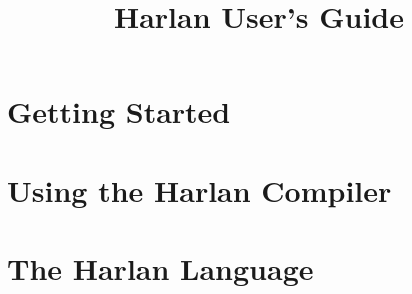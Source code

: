 \documentclass{book}
\begin{document}
\title{Harlan User's Guide}

\maketitle

\tableofcontents

\chapter{Getting Started}

\chapter{Using the Harlan Compiler}

\chapter{The Harlan Language}
\end{document}
